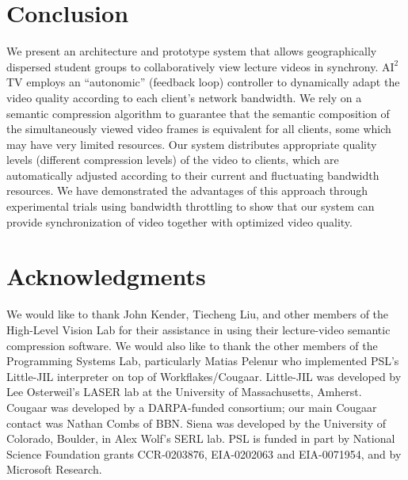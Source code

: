 \documentclass{sig-alternate}
\begin{document}
\section{Conclusion}

We present an architecture and prototype system that allows
geographically dispersed student groups to collaboratively view
lecture videos in synchrony. $\mathrm{AI}^2$TV employs an
``autonomic'' (feedback loop) controller to dynamically adapt the
video quality according to each client's network bandwidth.  We rely
on a semantic compression algorithm to guarantee that the semantic
composition of the simultaneously viewed video frames is equivalent
for all clients, some which may have very limited resources.  Our
system distributes appropriate quality levels (different compression
levels) of the video to clients, which are automatically adjusted
according to their current and fluctuating bandwidth resources.  We
have demonstrated the advantages of this approach through experimental
trials using bandwidth throttling to show that our system can provide
synchronization of video together with optimized video quality.

\section{Acknowledgments}

We would like to thank John Kender, Tiecheng Liu, and other members of
the High-Level Vision Lab for their assistance in using their
lecture-video semantic compression software.  We would also like to
thank the other members of the Programming Systems Lab, particularly
Matias Pelenur who implemented PSL's Little-JIL interpreter on top of
Workflakes/Cougaar.  Little-JIL was developed by Lee Osterweil's LASER
lab at the University of Massachusetts, Amherst. Cougaar was developed
by a DARPA-funded consortium; our main Cougaar contact was Nathan
Combs of BBN.  Siena was developed by the University of Colorado,
Boulder, in Alex Wolf's SERL lab. PSL is funded in part by National
Science Foundation grants CCR-0203876, EIA-0202063 and EIA-0071954,
and by Microsoft Research.

%  
% 
\end{document}

